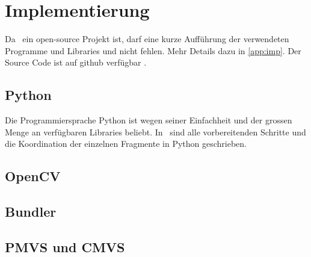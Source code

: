 	\section{Implementierung}  \label{imp:tech}
		Da \dronarch\ ein open-source Projekt ist, darf eine kurze Aufführung der verwendeten Programme und Libraries und nicht fehlen. Mehr Details dazu in \autoref{app:imp}. Der Source Code ist auf github verfügbar \cite{dronarch:github}.
		
		\subsection{Python}
			Die Programmiersprache Python ist wegen seiner Einfachheit und der grossen Menge an verfügbaren Libraries beliebt.
			In \dronarch\ sind alle vorbereitenden Schritte und die Koordination der einzelnen Fragmente in Python geschrieben.
			
		\subsection{OpenCV}
		
		\subsection{Bundler}
		

		\subsection{PMVS und CMVS}
